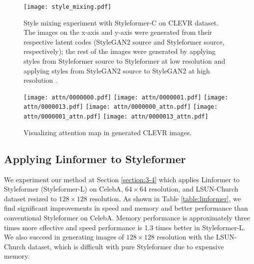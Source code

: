 \documentclass[10pt,twocolumn,letterpaper]{article}
\begin{document}
\begin{figure*}[t]
\begin{center}
\texttt{[image: style\_mixing.pdf]}

\end{center}
\vspace{-5mm}
\caption{Style mixing experiment with Styleformer-C on CLEVR dataset. The images on the x-axis and y-axis were generated from their respective latent codes (StyleGAN2 source and Styleformer source, respectively); the rest of the images were generated by applying styles from Styleformer source to Styleformer at low resolution  and applying styles from StyleGAN2 source to StyleGAN2 at high resolution \cite{karras2019stylebased}. 
}
\vspace{-3mm}
\label{fig:style-mixing}
\end{figure*}


\begin{figure}[t]
\begin{center}
\texttt{[image: attn/0000000.pdf]}
\texttt{[image: attn/0000001.pdf]}
\texttt{[image: attn/0000013.pdf]}
\texttt{[image: attn/0000000\_attn.pdf]}
\texttt{[image: attn/0000001\_attn.pdf]}
\texttt{[image: attn/0000013\_attn.pdf]}
\end{center}
\vspace{-5mm}
\caption{Visualizing attention map in generated CLEVR images.
}
\vspace{-3mm}
\label{fig:vis_attn}
\end{figure}





\subsection{Applying Linformer to Styleformer}
\label{section:4-2}
We experiment our method at Section \ref{section:3-4} which applies Linformer to Styleformer (Styleformer-L) on CelebA, $64 \times 64$ resolution, and LSUN-Church \cite{yu2016lsun} dataset resized to $128 \times 128$ resolution. 
As shown in Table \ref{table:linformer}, we find significant improvements in speed and memory and better performance than conventional Styleformer on CelebA. Memory performance is approximately three times more effective and speed performance is 1.3 times better in Styleformer-L. We also succeed in generating images of $128 \times 128$ resolution with the LSUN-Church dataset, which is difficult with pure Styleformer due to expensive memory. 
\end{document}
